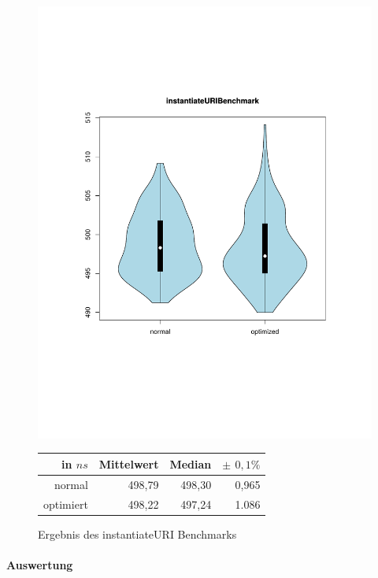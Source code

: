 \begin{figure}[H]
{		\includegraphics[trim=20mm 60mm 0mm 50mm,scale=0.50]{pictures/vioplot_instantiateURI.pdf}
	}

	\begin{table}[H]
	\centering
		\begin{tabular}{|r|r|r|r|}
			\hline
		   	in $ns$  & Mittelwert & Median & \bf{$\pm$ $0,1\%$} \\
		 	\hline
		 	\hline
		  	normal 	  & 498,79 & 498,30 & 0,965 \\
		 	optimiert & 498,22 & 497,24 & 1.086 \\ 
		  	\hline
		  	
		\end{tabular}
	\end{table}

	\caption{Ergebnis des instantiateURI Benchmarks}\label{bp:instURIBench}
\end{figure}

\paragraph{Auswertung}

